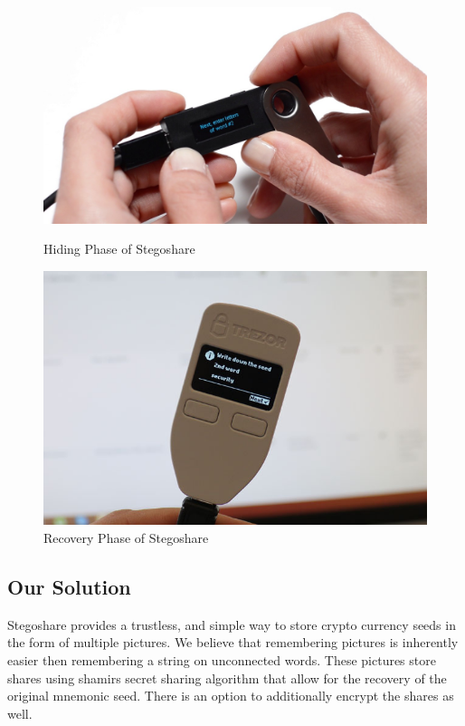 \begin{figure}[H]
\centering
\begin{minipage}{.5\textwidth}
  \centering
  \includegraphics[scale = 0.15]{ledgerPhrase.jpg}
	\caption{Hiding Phase of Stegoshare}
	\label{fig: Hiding Phas}
\end{minipage}%
\begin{minipage}{.5\textwidth}
  \centering
  \includegraphics[scale = 0.25]{trezorPhrase.jpg}
	\caption{Recovery Phase of Stegoshare}
	\label{fig: Recovery Phas}
\end{minipage}
\end{figure}

\newpage
\subsection{Our Solution}
Stegoshare provides a trustless, and simple way to store crypto currency seeds in the form of multiple pictures. We believe that remembering pictures is inherently easier then remembering
a string on unconnected words. These pictures store shares using shamirs secret sharing algorithm that allow for the recovery of the original mnemonic seed. There is an option to additionally encrypt
the shares as well.

